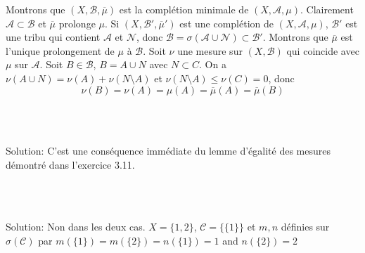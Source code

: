 \documentclass{report}
\begin{document}
Montrons que $(X,\mathcal B, \overline \mu)$ est la complétion minimale de $(X,\mathcal A,\mu) $. Clairement $\mathcal A\subset \mathcal B$ et $\overline \mu$ prolonge $\mu$. Si $(X,\mathcal B', \overline \mu')$ est une complétion de $(X,\mathcal A,\mu) $, $\mathcal B'$ est une tribu qui contient $\mathcal A$ et $\mathcal N$, donc $\mathcal B = \sigma(\mathcal A\cup \mathcal N)\subset \mathcal B'$.\newline \newline
Montrons que $\overline \mu$ est l'unique prolongement de $\mu$ à $\mathcal B$. Soit $\nu$ une mesure sur $(X,\mathcal B)$ qui coincide avec $\mu$ sur $\mathcal A$. Soit $B\in \mathcal B$, $B=A\cup N$ avec $N\subset C$. On a $\nu(A\cup N) = \nu(A)+\nu(N\setminus A)$ et $\nu(N\setminus A) \leq \nu(C) = 0$, donc $$\nu(B) = \nu(A) = \mu(A) = \overline \mu(A) = \overline \mu(B)$$


\subsection{} \\ \\

Solution:  C'est une conséquence immédiate du lemme d'égalité des mesures démontré dans l'exercice 3.11.


\subsection{} \\ \\

Solution: Non dans les deux cas. $X=\{1,2\}$, $\mathcal{C}=\{\{1\}\}$ et $m,n$ définies sur $\sigma(\mathcal{C})$ par $m(\{1\})=m(\{2\})=n(\{1\})=1$ and $n(\{2\})=2$
\newpage 

\subsection{} \\ \\
\end{document}
